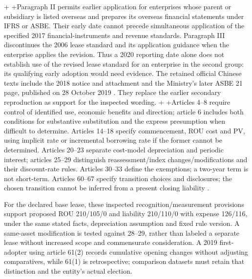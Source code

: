+
+Paragraph II permits earlier application for enterprises whose parent or subsidiary is listed overseas and prepares its overseas financial statements under IFRS or ASBE. Their early date cannot precede simultaneous application of the specified 2017 financial-instruments and revenue standards. Paragraph III discontinues the 2006 lease standard and its application guidance when the enterprise applies the revision. Thus a 2020 reporting date alone does not establish use of the revised lease standard for an enterprise in the second group: its qualifying early adoption would need evidence. The retained official Chinese texts include the 2018 notice and attachment and the Ministry's later ASBE 21 page, published on 28 October 2019 \citep{moflease2018,mofasbe21}. They replace the earlier secondary reproduction as support for the inspected wording.
+
+Articles 4--8 require control of identified use, economic benefits and direction; article 6 includes both conditions for substantive substitution and the express presumption when difficult to determine. Articles 14--18 specify commencement, ROU cost and PV, using implicit rate or incremental borrowing rate if the former cannot be determined. Articles 20--23 separate cost-model depreciation and periodic interest; articles 25--29 distinguish reassessment/index changes/modifications and their discount-rate rules. Articles 30--33 define the exemptions; a two-year term is not short-term. Articles 60--67 specify transition choices and disclosures; the chosen transition cannot be inferred from a present closing liability \citep[attached standard, arts.\ 4--8, 14--33, 60--67]{moflease2018}.
 
 For the declared base lease, these inspected recognition/measurement provisions support proposed ROU 210/105/0 and liability 210/110/0 with expense 126/116, under the same stated facts, depreciation assumption and fixed rule version. A same-asset modification is tested against 28--29, rather than labeled a separate lease without increased scope and commensurate consideration. A 2019 first-adopter using article 61(2) records cumulative opening changes without adjusting comparatives, while 61(1) is retrospective; comparison datasets must retain that distinction and the entity's actual election.
 
